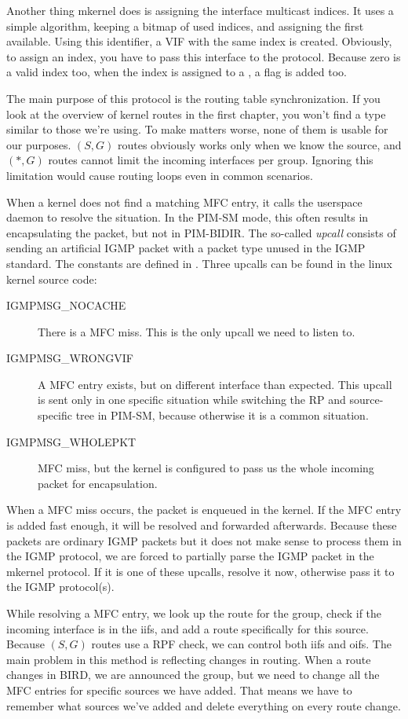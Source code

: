 Another thing mkernel does is assigning the interface multicast indices. It
uses a simple algorithm, keeping a bitmap of used indices, and assigning the
first available. Using this identifier, a VIF with the same index is created.
Obviously, to assign an index, you have to pass this interface to the protocol.
Because zero is a valid index too, when the index is assigned to a , a flag  is added too.

The main purpose of this protocol is the routing table synchronization. If you
look at the overview of kernel routes in the first chapter, you won't find
a type similar to those we're using. To make matters worse, none of them is
usable for our purposes. $(S, G)$ routes obviously works only when we know the
source, and $(*,G)$ routes cannot limit the incoming interfaces per group.
Ignoring this limitation would cause routing loops even in common scenarios.

When a kernel does not find a matching MFC entry, it calls the userspace daemon
to resolve the situation. In the PIM-SM mode, this often results in
encapsulating the packet, but not in PIM-BIDIR. The so-called \emph{upcall}
consists of sending an artificial IGMP packet with a packet type unused in the
IGMP standard. The constants are defined in . Three
upcalls can be found in the linux kernel source code:

\begin{description}
\item[IGMPMSG\_NOCACHE] There is a MFC miss. This is the only upcall we need to
  listen to.
\item[IGMPMSG\_WRONGVIF] A MFC entry exists, but on different interface than
  expected. This upcall is sent only in one specific situation while switching
  the RP and source-specific tree in PIM-SM, because otherwise it is a common
  situation.
\item[IGMPMSG\_WHOLEPKT] MFC miss, but the kernel is configured to pass us the
  whole incoming packet for encapsulation.
\end{description}

When a MFC miss occurs, the packet is enqueued in the kernel. If the MFC entry
is added fast enough, it will be resolved and forwarded afterwards. Because
these packets are ordinary IGMP packets but it does not make sense to process
them in the IGMP protocol, we are forced to partially parse the IGMP packet in
the mkernel protocol. If it is one of these upcalls, resolve it now, otherwise
pass it to the IGMP protocol(s).

While resolving a MFC entry, we look up the route for the group, check if the
incoming interface is in the iifs, and add a route specifically for this
source. Because $(S,G)$ routes use a RPF check, we can control both iifs and
oifs. The main problem in this method is reflecting changes in routing. When
a route changes in BIRD, we are announced the group, but we need to change all
the MFC entries for specific sources we have added. That means we have to
remember what sources we've added and delete everything on every route change.

